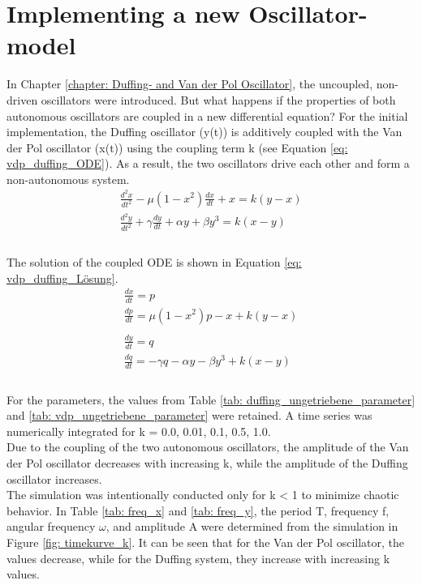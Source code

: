 \documentclass[oneside,10pt,a4paper]{report}
\begin{document}
		\chapter{Implementing a new Oscillator-model}
		In Chapter \ref{chapter: Duffing- and Van der Pol Oscillator}, the uncoupled, non-driven oscillators were introduced. But what happens if the properties of both autonomous oscillators are coupled in a new differential equation? For the initial implementation, the Duffing oscillator (y(t)) is additively coupled with the Van der Pol oscillator (x(t)) using the coupling term k (see Equation \ref{eq: vdp_duffing_ODE}). As a result, the two oscillators drive each other and form a non-autonomous system.
		\begin{equation}\label{eq: vdp_duffing_ODE}
			\begin{split}
				\frac{d^2x}{dt^2} - \mu (1 - x^2) \frac{dx}{dt} + x = k ( y- x )\\
				\frac{d^2y}{dt^2} + \gamma \frac{dy}{dt} + \alpha y + \beta y^3 = k ( x-y )\\
			\end{split}
		\end{equation}
		\\
		The solution of the coupled ODE is shown in Equation \ref{eq: vdp_duffing_Lösung}.
			\begin{equation}\label{eq: vdp_duffing_Lösung}		
			\begin{gathered}
				\frac{dx}{dt} = p\\
				\frac{dp}{dt} = \mu (1 - x^2) p - x +k ( y- x )\\
				\\
				\frac{dy}{dt} = q\\
				\frac{dq}{dt} = - \gamma q - \alpha y - \beta y^3 + k ( x-y )\\
			\end{gathered}		
		\end{equation}
		\\
		For the parameters, the values from Table \ref{tab: duffing_ungetriebene_parameter} and \ref{tab: vdp_ungetriebene_parameter} were retained. A time series was numerically integrated for k = 0.0, 0.01, 0.1, 0.5, 1.0.\\
		 Due to the coupling of the two autonomous oscillators, the amplitude of the Van der Pol oscillator decreases with increasing k, while the amplitude of the Duffing oscillator increases. \\
		 The simulation was intentionally conducted only for k < 1 to minimize chaotic behavior. In Table \ref{tab: freq_x} and \ref{tab: freq_y}, the period T, frequency f, angular frequency $\omega$, and amplitude A were determined from the simulation in Figure \ref{fig: timekurve_k}. It can be seen that for the Van der Pol oscillator, the values decrease, while for the Duffing system, they increase with increasing k values.
		
\end{document}
